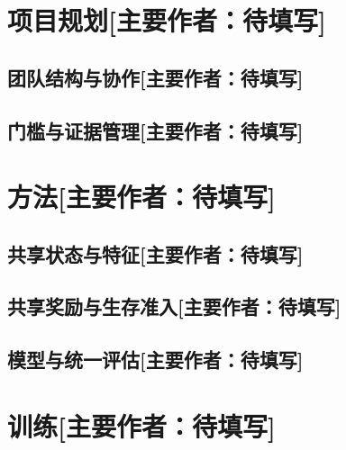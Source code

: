 \documentclass[UTF8,11pt,a4paper,fontset=none]{ctexart}
\newcommand{\primaryauthor}[1]{\texorpdfstring{\enspace\normalfont\small[主要作者：#1]}{ [主要作者：#1]}}
\newcommand{\authorsection}[2]{\section{#1\primaryauthor{#2}}}
\newcommand{\authorsubsection}[2]{\subsection{#1\primaryauthor{#2}}}
\newcommand{\pendingauthor}{待填写}
\newif\ifdraftguidance
\newcommand{\writingnote}[1]{%
  \ifdraftguidance
    \par\noindent\begingroup\color{promptblue}\small
    \fbox{\begin{minipage}{0.94\linewidth}\textbf{写作提示：}#1\end{minipage}}%
    \par\endgroup
  \fi
}
\newcommand{\todoitem}[1]{%
  \ifdraftguidance\textcolor{promptblue}{\textbf{[待补：#1]}}\fi
}
\begin{document}
\authorsection{项目规划}{\pendingauthor}

\authorsubsection{团队结构与协作}{\pendingauthor}
\writingnote{路线一为 Continuous Double DQN Task 1--4 与 survival mask；路线二为 Rainbow Lite Task 1--4、feature/reward 与延迟信用；路线三为 Q-learning/CNN Task 1--2 与跨学习器迁移。说明三条路线共享代码、指标、失败案例和选模规则，不得描述为三个独立项目。}
\todoitem{正文}

\authorsubsection{门槛与证据管理}{\pendingauthor}
\writingnote{说明“训练→开发选模→独立确认→主验证→打包”的流程；区分 training seed 与 environment seed，未运行记为 unrun，不可记为零；冻结 checkpoint、关闭探索、使用单线程 CPU，并记录配置/checkpoint 哈希和 paired bootstrap。}
\todoitem{正文}

\authorsection{方法}{\pendingauthor}

\authorsubsection{共享状态与特征}{\pendingauthor}
\writingnote{说明离散键、84 维 tile coding、70/78/84 维连续表示、117 维 phase 表示和 17 通道 CNN；将 Feature v1--v11 按导航、历史/循环、危险、资源、对手和目标可达性归类；明确版本号仅作复现标识，不代表单调性能顺序。}
\todoitem{正文}

\authorsubsection{共享奖励与生存准入}{\pendingauthor}
\writingnote{将 Reward r1--r22 按正式事件、势函数、WAIT/循环、炸弹信用、生存和对手事件归类；Feature、reward、mask 是独立版本轴；区分 physical legal action、finite-horizon survivable action、veto-only mask 和 fallback；说明 Survival-mask v1--v9 由具体反例驱动，并保留 world 27155 限制。}
\todoitem{正文}

\authorsubsection{模型与统一评估}{\pendingauthor}
\writingnote{介绍表格 Q/Double Q/Watkins Double Q($\lambda$)、Continuous/CNN Double DQN 与蒸馏 CNN；Rainbow Lite 定义为 dueling + proportional PER + fixed 4-step，不称完整 Rainbow；指标和可比性严格遵循 report-assets/plan/experiment-protocol.md。}
\todoitem{正文}

\writingnote{图表占位：Figure 1 为课程训练与证据流程；Figure 2 为 Die Hardest 推理和动作准入；Table 1 为模型族及证据状态。插入正式图表时使用 report-assets 中的可追溯资产。}
\todoitem{Figure 1、Figure 2 与 Table 1}

\authorsection{训练}{\pendingauthor}
\writingnote{说明 Task 1 导航、Task 2 炸箱与隐藏金币、Task 3 弱对手、Task 4 三个规则对手；当前任务、旧任务保留、安全和运行时共同决定晋级；严格 resume 与 policy-only transfer 分开，合同变化时显式迁移或重训；表格/MLP 主要使用 CPU，CNN 训练使用 GPU，最终评估为 CPU-only；保留 CNN 输入 bug、WAIT/循环、Task 2 自杀、Task 3 计数缺陷及 Task 4 超时/中断等失败记录。}
\todoitem{正文}
\end{document}
